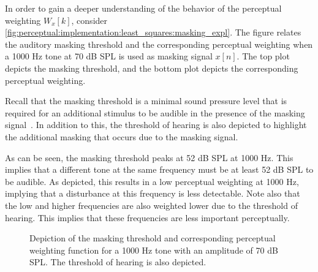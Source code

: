 In order to gain a deeper understanding of the behavior of the perceptual weighting $W_x[k]$, consider 
\autoref{fig:perceptual:implementation:least_squares:masking_expl}.
The figure relates the auditory masking threshold and the corresponding perceptual weighting when a 1000 Hz tone at 70 dB SPL is used as masking signal $x[n]$.
The top plot depicts the masking threshold, and the bottom plot depicts the corresponding perceptual weighting.

Recall that the masking threshold is a minimal sound pressure level that is required for an additional stimulus to be audible in the presence of the masking signal~\cite{painter2000perceptual}.
In addition to this, the threshold of hearing is also depicted to highlight the additional masking that occurs due to the masking signal.

As can be seen, the masking threshold peaks at 52 dB SPL at 1000 Hz.
This implies that a different tone at the same frequency must be at least 52 dB SPL to be audible.
As depicted, this results in a low perceptual weighting at 1000 Hz, implying that a disturbance at this frequency is less detectable.
Note also that the low and higher frequencies are also weighted lower due to the threshold of hearing.
This implies that these frequencies are less important perceptually.

\begin{figure}[]
    \centering
    \scalebox{1.0}{}
    \caption{Depiction of the masking threshold and corresponding perceptual weighting 
        function for a 1000 Hz tone with an amplitude of 70 dB SPL.
        The threshold of hearing is also depicted.}
    \label{fig:perceptual:implementation:least_squares:masking_expl}
\end{figure}
